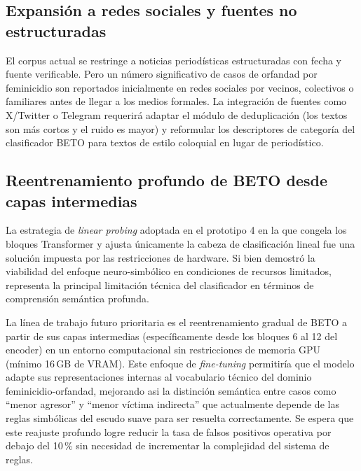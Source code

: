 \subsection*{Expansión a redes sociales y fuentes no estructuradas}
\label{subsec:fut_social}

El corpus actual se restringe a noticias periodísticas estructuradas con fecha y
fuente verificable. Pero un número significativo de casos de orfandad
por feminicidio son reportados inicialmente en redes sociales por vecinos,
colectivos o familiares antes de llegar a los medios formales. La integración
de fuentes como X/Twitter o Telegram requerirá adaptar el módulo de
deduplicación (los textos son más cortos y el ruido es mayor) y reformular
los descriptores de categoría del clasificador BETO para textos de estilo
coloquial en lugar de periodístico.

\subsection*{Reentrenamiento profundo de BETO desde capas intermedias}
\label{subsec:fut_beto_finetune}

La estrategia de \textit{linear probing} adoptada en el prototipo 4 en la que congela
los bloques Transformer y ajusta únicamente la cabeza de
clasificación lineal fue una solución impuesta por las restricciones
de hardware. Si bien demostró la
viabilidad del enfoque neuro-simbólico en condiciones de recursos limitados,
representa la principal limitación técnica del clasificador en términos de
comprensión semántica profunda.

La línea de trabajo futuro prioritaria es el reentrenamiento gradual de BETO
a partir de sus capas intermedias (específicamente desde los bloques 6 al 12 del
encoder) en un entorno computacional sin restricciones de memoria GPU (mínimo
16\,GB de VRAM). Este enfoque de \textit{fine-tuning} permitiría que el modelo adapte sus representaciones internas al
vocabulario técnico del dominio feminicidio-orfandad, mejorando asi la distinción
semántica entre casos como ``menor agresor'' y ``menor víctima indirecta''
que actualmente depende de las reglas simbólicas del escudo suave para ser resuelta correctamente. Se espera que
este reajuste profundo logre reducir la tasa de falsos positivos operativa por debajo
del 10\,\% sin necesidad de incrementar la complejidad del sistema de reglas.
 